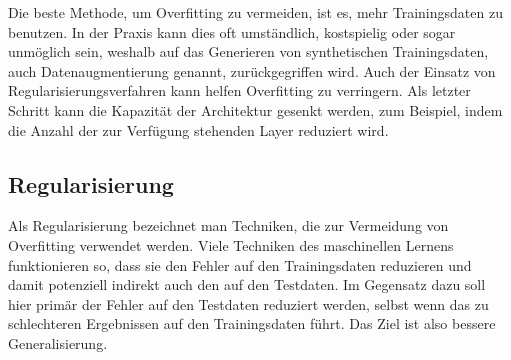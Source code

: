 Die beste Methode, um Overfitting zu vermeiden, ist es, mehr Trainingsdaten zu benutzen.
In der Praxis kann dies oft umständlich, kostspielig oder sogar unmöglich sein, 
weshalb auf das Generieren von synthetischen Trainingsdaten, auch Datenaugmentierung genannt, zurückgegriffen wird.
Auch der Einsatz von Regularisierungsverfahren kann helfen Overfitting zu verringern.
Als letzter Schritt kann die Kapazität der Architektur gesenkt werden,
zum Beispiel, indem die Anzahl der zur Verfügung stehenden Layer reduziert wird.



\subsection{Regularisierung} \label{ssec:Regul}


Als Regularisierung bezeichnet man Techniken, die zur Vermeidung von Overfitting verwendet werden.
Viele Techniken des maschinellen Lernens funktionieren so, dass sie den Fehler auf den Trainingsdaten reduzieren und damit potenziell indirekt auch den auf den Testdaten.
Im Gegensatz dazu soll hier primär der Fehler auf den Testdaten reduziert werden, selbst wenn das zu schlechteren Ergebnissen auf den Trainingsdaten führt.
Das Ziel ist also bessere Generalisierung.

